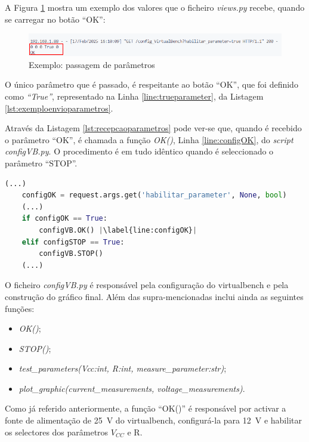 A Figura \ref{fig:passagemparametros} mostra um exemplo dos valores que o ficheiro \textit{views.py} recebe, quando se carregar no botão ``OK'':
\begin{figure}[hbtp]
	\centering
	\includegraphics[width=1\textwidth]{figures/exemplo_dados_Ohm.png}
	\caption{Exemplo: passagem de parâmetros}
	\label{fig:passagemparametros}
\end{figure}

O único parâmetro que é passado, é respeitante ao botão ``OK'', que foi definido como \textit{``True''}, representado na Linha \ref{line:trueparameter}, da Listagem \ref{lst:exemploenvioparametros}.

Através da Listagem \ref{lst:recepcaoparametros} pode ver-se que, quando é recebido o parâmetro ``OK'', é chamada a função \textit{OK()}, Linha \ref{line:configOK}, do \textit{script} \textit{configVB.py}. O procedimento é em tudo idêntico quando é seleccionado o parâmetro ``STOP''.

\begin{minipage}{0.9\linewidth}
	\begin{lstlisting}[language=python, escapechar=|, caption=Teste do parâmetro ``OK'' (\ldots e ``STOP'') no ficheiro \textit{views.py}, label=lst:recepcaoparametros]
	(...)
	configOK = request.args.get('habilitar_parameter', None, bool)
	(...)
	if configOK == True:
        configVB.OK() |\label{line:configOK}|  
    elif configSTOP == True:
        configVB.STOP()	
	(...)
	\end{lstlisting}
\end{minipage}

O ficheiro \textit{configVB.py} é responsável pela configuração do \acrshort{virtualbench} e pela construção do gráfico final. Além das supra-mencionadas inclui ainda as seguintes funções:
\begin{itemize}
	\item \textit{OK()};
	\item \textit{STOP()};
	\item \textit{test\_parameters(Vcc:int, R:int, measure\_parameter:str)};
	\item \textit{plot\_graphic(current\_measurements, voltage\_measurements)}.
\end{itemize}

Como já referido anteriormente, a função ``OK()'' é responsável por activar a fonte de alimentação de \SI{25}{\volt} do \acrshort{virtualbench}, configurá-la para \SI{12}{\volt} e habilitar os selectores dos parâmetros $V_{CC}$ e R. 

